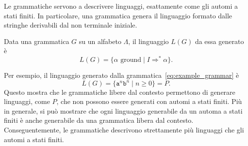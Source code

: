 Le grammatiche servono a descrivere linguaggi, esattamente come gli automi a
stati finiti. In particolare, una grammatica genera il linguaggio formato
dalle stringhe derivabili dal non terminale iniziale.
%
\begin{definition}
  \label{def:gen_grammar}
Data una grammatica $G$ su un alfabeto $\Lambda$,
il linguaggio $L(G)$ da essa generato \`e
\[
  L(G)=\{\alpha\text{ ground}\mid I\Rightarrow^*\alpha\}.
\]
\end{definition}
%
\noindent
Per esempio, il linguaggio generato dalla grammatica~\eqref{eq:example_grammar}
\`e
%
\[
  L(G)=\{\mathtt{a}^n\mathtt{b}^n\mid n\ge 0\}=P.
\]
%
Questo mostra che le grammatiche libere dal contesto permettono di generare
linguaggi, come $P$, che non possono essere generati con automi a stati finiti.
Pi\`u in generale, si pu\`o
mostrare che ogni linguaggio generabile da un automa a stati
finiti \`e anche generabile da una grammatica libera dal contesto.
Conseguentemente, le grammatiche descrivono strettamente
pi\`u linguaggi che gli automi a stati finiti.


